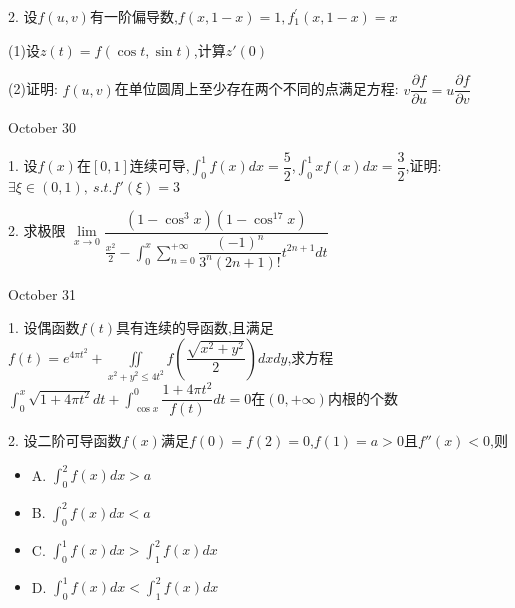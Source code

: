 \begin{solution}
	
\end{solution}


2. 设$f(u,v)$有一阶偏导数,$f(x,1-x)=1,f_{1}^{'}(x,1-x)=x$

(1)设$z(t)=f(\cos t,\sin t)$,计算$z'(0)$

(2)证明:  $f(u,v)$在单位圆周上至少存在两个不同的点满足方程:  $v\dfrac{\partial f}{\partial u}=u\dfrac{\partial f}{\partial v}$

\begin{solution}
	
\end{solution}


\textcolor{purplea}{October 30}

1. 设$f(x)$在$[0,1]$连续可导,$\int_{0}^{1}f(x)dx=\dfrac{5}{2}$,$\int_{0}^{1}xf(x)dx=\dfrac{3}{2}$,证明:$\exists \xi\in(0,1),\ s.t. f'(\xi)=3$

\begin{solution}
	
\end{solution}


2. 求极限 $\lim\limits_{x\to 0 }\dfrac{(1-\cos^3 x)(1-\cos^{17} x)}{\frac{x^2}{2}-\int_{0}^{x}\sum\limits_{n=0}^{+\infty}\dfrac{(-1)^n}{3^n(2n+1)!}t^{2n+1}dt}$

\begin{solution}
	
\end{solution}


\textcolor{purplea}{October 31}

1. 设偶函数$f(t)$具有连续的导函数,且满足$f(t)=e^{4\pi t^2}+\iint\limits_{x^2+y^2\leq 4t^2}f(\dfrac{\sqrt{x^2+y^2}}{2})dxdy$,求方程$\int_{0}^{x}\sqrt{1+4\pi t^2}dt+\int_{\cos x}^{0}\dfrac{1+4\pi t^2}{f(t)}dt=0$在$(0,+\infty)$内根的个数

\begin{solution}
	
\end{solution}


2. 设二阶可导函数$f(x)$满足$f(0)=f(2)=0$,$f(1)=a>0$且$f''(x)<0$,则
\begin{itemize}
	\item A. $\int_{0}^{2}f(x)dx>a$
	\item B. $\int_{0}^{2}f(x)dx<a$
	\item C. $\int_{0}^{1}f(x)dx>\int_{1}^{2}f(x)dx$
	\item D. $\int_{0}^{1}f(x)dx<\int_{1}^{2}f(x)dx$
\end{itemize}

\begin{solution}
	
\end{solution}
